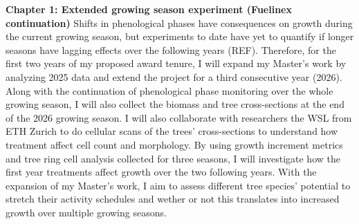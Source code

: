 \documentclass[12pt]{article}
\begin{document}
\textbf{Chapter 1: Extended growing season experiment (Fuelinex continuation)}
Shifts in phenological phases have consequences on growth during the current growing season, but experiments to date have yet to quantify if longer seasons have lagging effects over the following years (REF). Therefore, for the first two years of my proposed award tenure, I will expand my Master's work by analyzing 2025 data and extend the project for a third consecutive year (2026). Along with the continuation of phenological phase monitoring over the whole growing season, I will also collect the biomass and tree cross-sections at the end of the 2026 growing season. I will also collaborate with researchers the WSL from ETH Zurich to do cellular scans of the trees' cross-sections to understand how treatment affect cell count and morphology. By using growth increment metrics and tree ring cell analysis collected for three seasons, I will investigate how the first year treatments affect growth over the two following years. With the expansion of my Master's work, I aim to assess different tree species’ potential to stretch their activity schedules and wether or not this translates into increased growth over multiple growing seasons. \\
\end{document}
